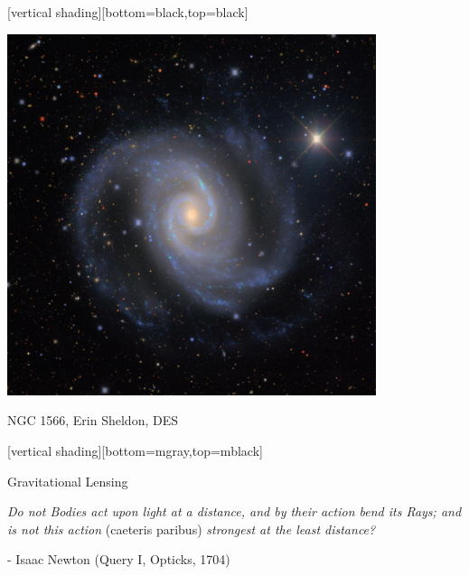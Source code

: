 \documentclass{beamer}
\begin{document}
{
    [vertical shading][bottom=black,top=black]
	
    \frame
    {

        \begin{center}
            \includegraphics[width=0.81\textwidth]{DES0421-5457-gri-ngc1566.jpg}

            {\tiny \hfill NGC 1566, Erin Sheldon, DES}
        \end{center}
    }

    [vertical shading][bottom=mgray,top=mblack]

}


\frame
{

    {\Huge Gravitational Lensing}

}


\frame
{

    {\Large 
        {\em Do not Bodies act upon light at a distance, and by their action bend its Rays;
        and is not this action } (caeteris paribus) {\em strongest at the least distance?}
        \newline

        \hfill - Isaac Newton (Query I, Opticks, 1704)
    }
}
\end{document}
